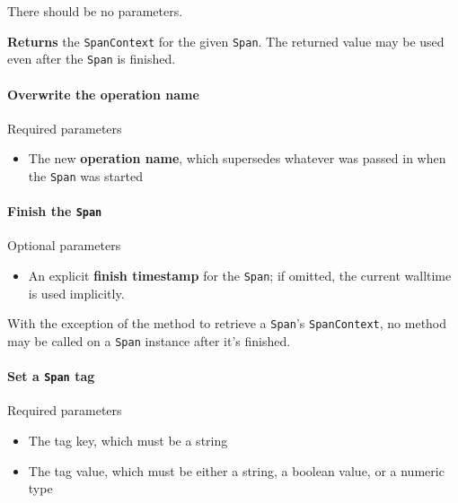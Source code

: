 \documentclass[a4paper,12pt,notitlepage,twoside,openright]{article}
\begin{document}
There should be no parameters.

\textbf{Returns} the \texttt{SpanContext} for the given \texttt{Span}.
The returned value may be used even after the \texttt{Span} is finished.

\hypertarget{overwrite-the-operation-name}{%
\paragraph{Overwrite the operation
name}\label{overwrite-the-operation-name}}

Required parameters

\begin{itemize}

\item
  The new \textbf{operation name}, which supersedes whatever was passed
  in when the \texttt{Span} was started
\end{itemize}

\hypertarget{finish-the-span}{%
\paragraph{\texorpdfstring{Finish the
\texttt{Span}}{Finish the Span}}\label{finish-the-span}}

Optional parameters

\begin{itemize}

\item
  An explicit \textbf{finish timestamp} for the \texttt{Span}; if
  omitted, the current walltime is used implicitly.
\end{itemize}

With the exception of the method to retrieve a \texttt{Span}'s
\texttt{SpanContext}, no method may be called on a \texttt{Span}
instance after it's finished.

\hypertarget{set-a-span-tag}{%
\paragraph{\texorpdfstring{Set a \texttt{Span}
tag}{Set a Span tag}}\label{set-a-span-tag}}

Required parameters

\begin{itemize}

\item
  The tag key, which must be a string
\item
  The tag value, which must be either a string, a boolean value, or a
  numeric type
\end{itemize}
\end{document}
